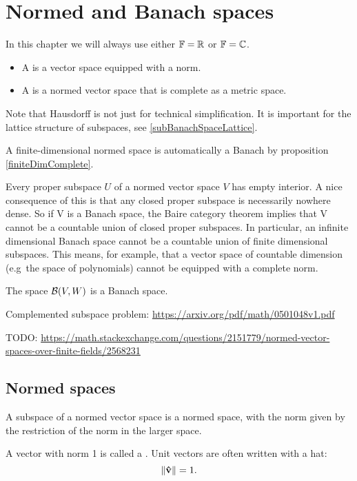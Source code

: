 \chapter{Normed and Banach spaces}
In this chapter we will always use either $\mathbb{F} = \mathbb{R}$ or $\mathbb{F} = \mathbb{C}$.

\begin{definition}
\begin{itemize}
\item A  is a vector space equipped with a norm.
\item A  is a normed vector space that is complete as a metric space.
\end{itemize}
\end{definition}

Note that Hausdorff is not just for technical simplification. It is important for the lattice structure of subspaces, see \ref{subBanachSpaceLattice}.

A finite-dimensional normed space is automatically a Banach by proposition \ref{finiteDimComplete}.

Every proper subspace $U$ of a normed vector space $V$ has empty interior.
A nice consequence of this is that any closed proper subspace is necessarily nowhere dense. So if V is a Banach space, the Baire category theorem implies that V cannot be a countable union of closed proper subspaces. In particular, an infinite dimensional Banach space cannot be a countable union of finite dimensional subspaces. This means, for example, that a vector space of countable dimension (e.g\ the space of polynomials) cannot be equipped with a complete norm.

The space $\operatorname{\mathcal{B}}(V,W)$ is a Banach space.


Complemented subspace problem: \url{https://arxiv.org/pdf/math/0501048v1.pdf}


TODO: \url{https://math.stackexchange.com/questions/2151779/normed-vector-spaces-over-finite-fields/2568231}

\section{Normed spaces}

\begin{lemma}
A subspace of a normed vector space is a normed space, with the norm given by the restriction of the norm in the larger space.
\end{lemma}

\begin{definition}
A vector with norm 1 is called a . Unit vectors are often written with a hat:
\[ \lVert\boldsymbol{\mathrm{\hat{v}}}\rVert = 1. \]
\end{definition}

